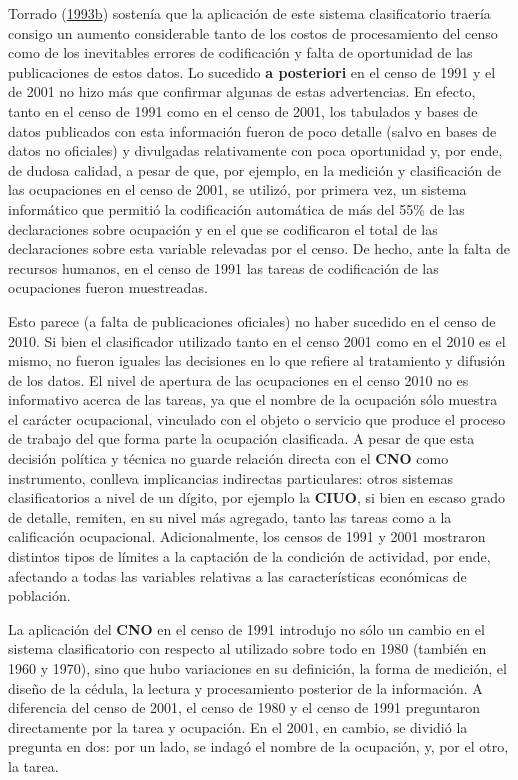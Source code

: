 \documentclass[
]{article}
\begin{document}
Torrado (\protect\hyperlink{ref-Torrado1993a}{1993b}) sostenía que la aplicación de este sistema clasificatorio traería consigo un aumento considerable tanto de los costos de procesamiento del censo como de los inevitables errores de codificación y falta de oportunidad de las publicaciones de estos datos. Lo sucedido \textbf{a posteriori} en el censo de 1991 y el de 2001 no hizo más que confirmar algunas de estas advertencias. En efecto, tanto en el censo de 1991 como en el censo de 2001, los tabulados y bases de datos publicados con esta información fueron de poco detalle (salvo en bases de datos no oficiales) y divulgadas relativamente con poca oportunidad y, por ende, de dudosa calidad, a pesar de que, por ejemplo, en la medición y clasificación de las ocupaciones en el censo de 2001, se utilizó, por primera vez, un sistema informático que permitió la codificación automática de más del 55\% de las declaraciones sobre ocupación y en el que se codificaron el total de las declaraciones sobre esta variable relevadas por el censo. De hecho, ante la falta de recursos humanos, en el censo de 1991 las tareas de codificación de las ocupaciones fueron muestreadas.

Esto parece (a falta de publicaciones oficiales) no haber sucedido en el censo de 2010. Si bien el clasificador utilizado tanto en el censo 2001 como en el 2010 es el mismo, no fueron iguales las decisiones en lo que refiere al tratamiento y difusión de los datos. El nivel de apertura de las ocupaciones en el censo 2010 no es informativo acerca de las tareas, ya que el nombre de la ocupación sólo muestra el carácter ocupacional, vinculado con el objeto o servicio que produce el proceso de trabajo del que forma parte la ocupación clasificada. A pesar de que esta decisión política y técnica no guarde relación directa con el \textbf{CNO} como instrumento, conlleva implicancias indirectas particulares: otros sistemas clasificatorios a nivel de un dígito, por ejemplo la \textbf{CIUO}, si bien en escaso grado de detalle, remiten, en su nivel más agregado, tanto las tareas como a la calificación ocupacional. Adicionalmente, los censos de 1991 y 2001 mostraron distintos tipos de límites a la captación de la condición de actividad, por ende, afectando a todas las variables relativas a las características económicas de población.

La aplicación del \textbf{CNO} en el censo de 1991 introdujo no sólo un cambio en el sistema clasificatorio con respecto al utilizado sobre todo en 1980 (también en 1960 y 1970), sino que hubo variaciones en su definición, la forma de medición, el diseño de la cédula, la lectura y procesamiento posterior de la información. A diferencia del censo de 2001, el censo de 1980 y el censo de 1991 preguntaron directamente por la tarea y ocupación. En el 2001, en cambio, se dividió la pregunta en dos: por un lado, se indagó el nombre de la ocupación, y, por el otro, la tarea.
\end{document}
